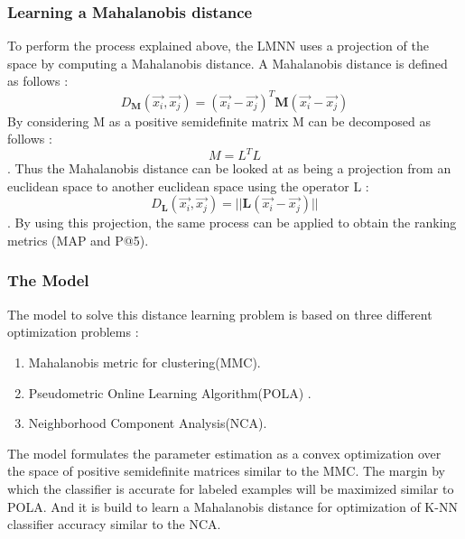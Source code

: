 \documentclass[hidelinks,12pt]{report}
\begin{document}
\subsubsection{Learning a Mahalanobis distance}
To perform the process explained above, the LMNN uses a projection of the space by computing a Mahalanobis distance. A Mahalanobis distance is defined as follows  : $$D_\textbf{M}(\vec{x_i},\vec{x_j})=(\vec{x_i}-\vec{x_j})^T\textbf{M}(\vec{x_i}-\vec{x_j})$$
By considering M as  a positive semidefinite matrix M can be decomposed as follows : $$M=L^TL$$. Thus the Mahalanobis distance can be looked at as being a projection from an euclidean space to another euclidean space using the operator L : $$D_\textbf{L}(\vec{x_i},\vec{x_j})=||\textbf{L}(\vec{x_i}-\vec{x_j})||$$. By using this projection, the same process can be applied to obtain the ranking metrics (MAP and P@5).
\subsubsection{The Model}
 The model to solve this distance learning problem is based on three different optimization problems : \begin{enumerate}
\item Mahalanobis metric for clustering(MMC). \cite{X02}
\item Pseudometric Online Learning Algorithm(POLA) . \cite{S04}
\item Neighborhood Component Analysis(NCA). \cite{G05}
\end{enumerate}
The model formulates the parameter estimation as a convex optimization over the space of positive semidefinite matrices similar to the MMC. The margin by which the classifier is accurate for labeled examples will be maximized similar to POLA. And it is build to learn a Mahalanobis distance for optimization of K-NN classifier accuracy similar to the NCA. 
\end{document}
